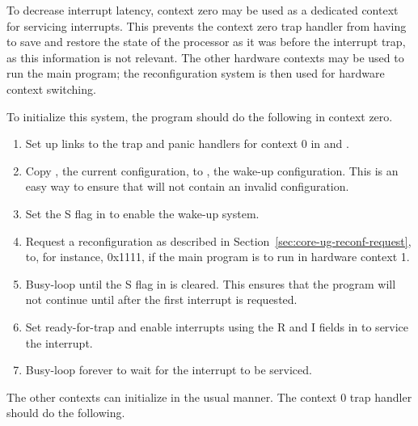 To decrease interrupt latency, context zero may be used as a dedicated context
for servicing interrupts. This prevents the context zero trap handler from
having to save and restore the state of the processor as it was before the
interrupt trap, as this information is not relevant. The other hardware contexts
may be used to run the main program; the reconfiguration system is then used for
hardware context switching.

To initialize this system, the program should do the following in context zero.

\begin{enumerate}

\item Set up links to the trap and panic handlers for context 0 in  and
.

\item Copy , the current configuration, to , the wake-up
configuration. This is an easy way to ensure that  will not contain
an invalid configuration.

\item Set the S flag in  to enable the wake-up system.

\item Request a reconfiguration as described in 
Section~\ref{sec:core-ug-reconf-request}, to, for instance, 0x1111, if the main 
program is to run in hardware context 1.

\item Busy-loop until the S flag in  is cleared. This ensures that
the program will not continue until after the first interrupt is requested.

\item Set ready-for-trap and enable interrupts using the R and I fields in 
 to service the interrupt.

\item Busy-loop forever to wait for the interrupt to be serviced.

\end{enumerate}

\noindent The other contexts can initialize in the usual manner. The context 0 
trap handler should do the following.


